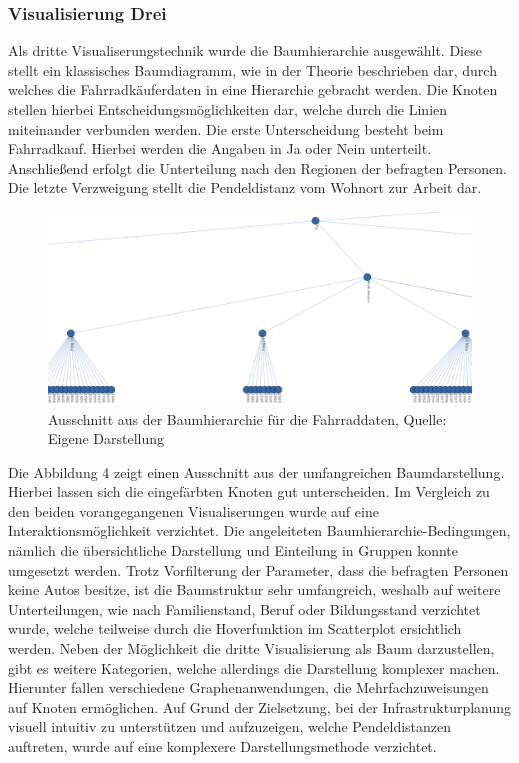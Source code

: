 \documentclass[usegeometry=true]{scrartcl}
\begin{document}
\subsubsection{Visualisierung Drei}
Als dritte Visualiserungstechnik wurde die Baumhierarchie ausgewählt. Diese stellt ein klassisches Baumdiagramm, wie in der Theorie beschrieben dar, durch welches die Fahrradkäuferdaten in eine Hierarchie gebracht werden. Die Knoten stellen hierbei Entscheidungsmöglichkeiten dar, welche durch die Linien miteinander verbunden werden. Die erste Unterscheidung besteht beim Fahrradkauf. Hierbei werden die Angaben in Ja oder Nein unterteilt. Anschließend erfolgt die Unterteilung nach den Regionen der befragten Personen. Die letzte Verzweigung stellt die Pendeldistanz vom Wohnort zur Arbeit dar. 
\begin{figure}[h]
\begin{center}
\includegraphics[width=12cm]{Bilder/V3Baumhierarchie.png}
\caption{Ausschnitt aus der Baumhierarchie für die Fahrraddaten, Quelle: Eigene Darstellung}
\end{center}
\end{figure}
\newpage
Die Abbildung 4 zeigt einen Ausschnitt aus der umfangreichen Baumdarstellung. Hierbei lassen sich die eingefärbten Knoten gut unterscheiden. Im Vergleich zu den beiden vorangegangenen Visualiserungen wurde auf eine Interaktionsmöglichkeit verzichtet. Die angeleiteten Baumhierarchie-Bedingungen, nämlich die übersichtliche Darstellung und Einteilung in Gruppen konnte umgesetzt werden. Trotz Vorfilterung der Parameter, dass die befragten Personen keine Autos besitze, ist die Baumstruktur sehr umfangreich, weshalb auf weitere Unterteilungen, wie nach Familienstand, Beruf oder Bildungsstand verzichtet wurde, welche teilweise durch die Hoverfunktion im Scatterplot ersichtlich werden. Neben der Möglichkeit die dritte Visualisierung als Baum darzustellen, gibt es weitere Kategorien, welche allerdings die Darstellung komplexer machen. Hierunter fallen verschiedene Graphenanwendungen, die Mehrfachzuweisungen auf Knoten ermöglichen. Auf Grund der Zielsetzung, bei der Infrastrukturplanung visuell intuitiv zu unterstützen und aufzuzeigen, welche Pendeldistanzen auftreten, wurde auf eine komplexere Darstellungsmethode verzichtet. 
\end{document}
